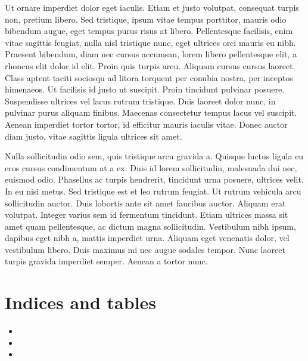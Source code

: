 \documentclass[letterpaper,10pt,english]{sphinxmanual}
\begin{document}
Ut ornare imperdiet dolor eget iaculis. Etiam et justo volutpat, consequat turpis non, pretium libero. Sed tristique, ipsum vitae tempus porttitor, mauris odio bibendum augue, eget tempus purus risus at libero. Pellentesque facilisis, enim vitae sagittis feugiat, nulla nisl tristique nunc, eget ultrices orci mauris eu nibh. Praesent bibendum, diam nec cursus accumsan, lorem libero pellentesque elit, a rhoncus elit dolor id elit. Proin quis turpis arcu. Aliquam cursus cursus laoreet. Class aptent taciti sociosqu ad litora torquent per conubia nostra, per inceptos himenaeos. Ut facilisis id justo ut suscipit. Proin tincidunt pulvinar posuere. Suspendisse ultrices vel lacus rutrum tristique. Duis laoreet dolor nunc, in pulvinar purus aliquam finibus. Maecenas consectetur tempus lacus vel suscipit. Aenean imperdiet tortor tortor, id efficitur mauris iaculis vitae. Donec auctor diam justo, vitae sagittis ligula ultrices sit amet.

Nulla sollicitudin odio sem, quis tristique arcu gravida a. Quisque luctus ligula eu eros cursus condimentum at a ex. Duis id lorem sollicitudin, malesuada dui nec, euismod odio. Phasellus ac turpis hendrerit, tincidunt urna posuere, ultrices velit. In eu nisi metus. Sed tristique est et leo rutrum feugiat. Ut rutrum vehicula arcu sollicitudin auctor. Duis lobortis ante sit amet faucibus auctor. Aliquam erat volutpat. Integer varius sem id fermentum tincidunt. Etiam ultrices massa sit amet quam pellentesque, ac dictum magna sollicitudin. Vestibulum nibh ipsum, dapibus eget nibh a, mattis imperdiet urna. Aliquam eget venenatis dolor, vel vestibulum libero. Duis maximus mi nec augue sodales tempor. Nunc laoreet turpis gravida imperdiet semper. Aenean a tortor nunc.


\chapter{Indices and tables}
\label{index:indices-and-tables}\begin{itemize}
\item {} 

\item {} 

\item {} 

\end{itemize}



\renewcommand{\indexname}{Index}
\printindex
\end{document}
